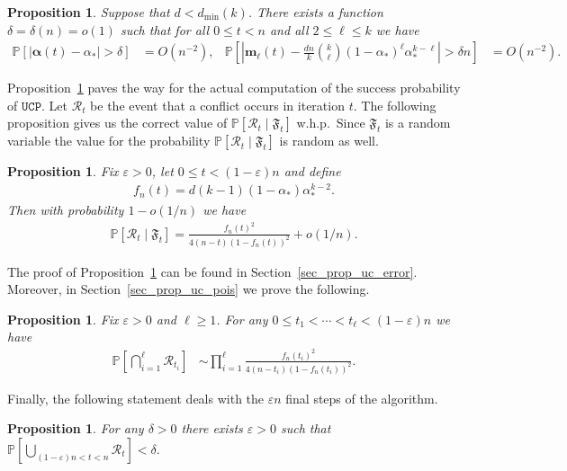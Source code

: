 \documentclass[10pt,reqno]{amsart}
\numberwithin{equation}{section}
\renewcommand{\vec}[1]{\boldsymbol{#1}}
\newcommand\dmin{d_{\mathrm{min}}}
\newcommand{\UCP}{\ensuremath{\mathtt{UCP}}}
\newcommand\cR{\mathcal R}
\newcommand\fF{\mathfrak F}
\newcommand\vm{\vec m}
\newcommand\eps{\varepsilon}
\newcommand\brk[1]{\left\lbrack{#1}\right\rbrack}
\newcommand\abs[1]{\left|{#1}\right|}
\newcommand{\whp}{w.h.p.}
\newcommand\pr{\mathbb{P}}
\newcommand\Prop{Proposition}
\newcommand\Sec{Section}
\newtheorem{proposition}[definition]{Proposition}
\def\pr{{\mathbb P}}
\begin{document}
\begin{proposition}\label{prop_uc_alpha}
	Suppose that $d<\dmin(k)$.
	There exists a function $\delta=\delta(n)=o(1)$ such that for all $0\leq t<n$ and all $2\leq\ell\leq k$ we have
	\begin{align}\label{eq_prop_uc_alpha}
		\pr\brk{|\vec\alpha(t)-\alpha_*|>\delta}&=O(n^{-2}),&
		\pr\brk{\abs{\vm_\ell(t)-\frac{dn}k\binom k\ell(1-\alpha_*)^\ell\alpha_*^{k-\ell}}>\delta n}&=O(n^{-2}).
	\end{align}
\end{proposition}

\Prop~\ref{prop_uc_alpha} paves the way for the actual computation of the success probability of \UCP.
Let $\cR_t$ be the event that a conflict occurs in iteration $t$.
The following proposition gives us the correct value of $\pr\brk{\cR_t \mid \fF_t} $ \whp\, 
Since $\fF_t$ is a random variable the value for the probability $\pr\brk{\cR_t \mid \fF_t} $ is random as well. 


\begin{proposition}\label{prop_uc_error}
	Fix $\eps>0$, let $0\leq t<(1-\eps)n$ and define
	\begin{align}\label{eq_prop_uc_error}
		f_n(t)= d(k-1)(1-\alpha_*)  \alpha_*^{k-2}.
	\end{align}
	Then with probability $1-o(1/n)$ we have 
	\begin{align*}
		\pr\brk{\cR_t \mid \fF_t} = \frac{f_n(t)^2}{4(n-t)(1-f_n(t))^2}+o(1/n).
	\end{align*}
\end{proposition}

The proof of \Prop~\ref{prop_uc_error} can be found in \Sec~\ref{sec_prop_uc_error}.
Moreover, in \Sec~\ref{sec_prop_uc_pois} we prove the following.

\begin{proposition}\label{prop_uc_pois}
	Fix $\eps>0$ and $\ell\geq1$.
	For any $0\leq t_1<\cdots<t_\ell<(1-\eps)n$ we have
	\begin{align}\label{eq_prop_uc_pois}
		\pr\brk{\bigcap_{i=1}^\ell\cR_{t_i}}&\sim\prod_{i=1}^\ell \frac{f_n(t_i)^2}{4(n-t_i)(1-f_n(t_i))^2}.
	\end{align}
\end{proposition}

Finally, the following statement deals with the $\eps n$ final steps of the algorithm.

\begin{proposition}\label{prop_uc_endgame}
	For any $\delta>0$ there exists $\eps>0$ such that $\pr\brk{\bigcup_{(1-\eps)n<t<n}\cR_{t}}<\delta.$ 
\end{proposition}
\end{document}
